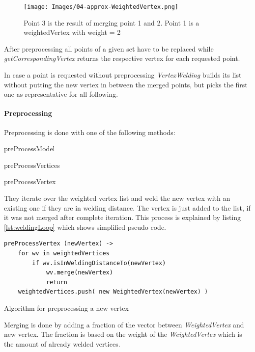 \documentclass[../ClassicThesis.tex]{subfiles}
\begin{document}
\begin{figure}
\texttt{[image: Images/04-approx-WeightedVertex.png]}
\caption{Point 3 is the result of merging point 1 and 2. Point 1 is a weightedVertex with weight = 2}
\label{fig:weightedVertex}
\end{figure}

After preprocessing all points of a given set have to be replaced while \emph{getCorrespondingVertex} returns the respective vertex for each requested point.

In case a point is requested without preprocessing \emph{VertexWelding} builds its list without putting the new vertex in between the merged points, but picks the first one as representative for all following.




\paragraph{Preprocessing}

Preprocessing is done with one of the following methods:

\begin{description}
    \item preProcessModel
    \item preProcessVertices
    \item preProcessVertex
\end{description}

They iterate over the weighted vertex list and weld the new vertex with an existing one if they are in welding distance. The vertex is just added to the list, if it was not merged after complete iteration. This process is explained by listing \ref{lst:weldingLoop} which shows simplified pseudo code.

\begin{listing}[!h]
\centering
\begin{verbatim}
preProcessVertex (newVertex) ->
    for wv in weightedVertices
        if wv.isInWeldingDistanceTo(newVertex)
            wv.merge(newVertex)
            return
    weightedVertices.push( new WeightedVertex(newVertex) )
\end{verbatim}
\caption{Algorithm for preprocessing a new vertex}
\label{lst:weldingLoop}
\end{listing}

Merging is done by adding a fraction of the vector between \emph{WeightedVertex} and new vertex. The fraction is based on the weight of the \emph{WeightedVertex} which is the amount of already welded vertices.
\end{document}
